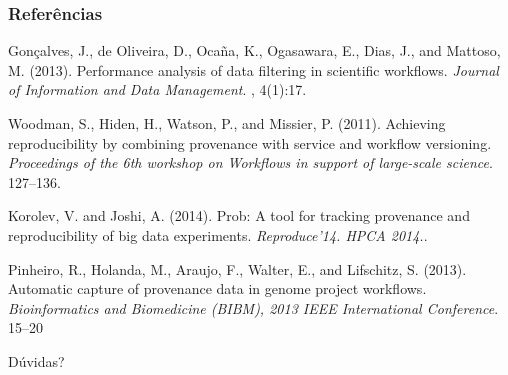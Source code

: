 \documentclass{beamer}
\begin{document}
\begin{frame}
\frametitle{Refer\^encias}
\footnotesize{
\begin{thebibliography}{99} %

  Gonçalves, J., de Oliveira, D., Oca\~na, K.,
Ogasawara, E., Dias, J., and Mattoso, M. (2013).
\newblock Performance analysis of data filtering in scientific workflows.
\newblock \emph{Journal of Information and Data Management}. , 4(1):17.

 Woodman, S., Hiden, H., Watson, P., and Missier, P. (2011).
\newblock Achieving reproducibility by combining provenance with service and workflow versioning.
\newblock \emph{Proceedings of the 6th workshop on Workflows in support of large-scale science}. 127--136.

 Korolev, V. and Joshi, A. (2014).
\newblock Prob: A tool for tracking provenance and reproducibility of
big data experiments.
\newblock \emph{Reproduce’14. HPCA 2014.}.

 Pinheiro, R., Holanda, M.,
  Araujo, F., Walter, E., and Lifschitz, S. (2013).
\newblock Automatic capture of provenance data in genome project workflows.
\newblock \emph{Bioinformatics and Biomedicine (BIBM), 2013 IEEE
  International Conference}. 15--20

\end{thebibliography}
}
\end{frame}


\begin{frame}
\Huge{\centerline{D\'uvidas?}}
\end{frame}

\end{document}
